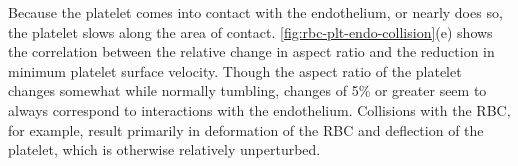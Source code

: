 Because the platelet comes into contact with the endothelium, or nearly does so, the platelet slows along the area
of contact. \cref{fig:rbc-plt-endo-collision}(e) shows the correlation between the relative change in aspect ratio
and the reduction in minimum platelet surface velocity. Though the aspect ratio of the platelet changes somewhat
while normally tumbling, changes of 5\% or greater seem to always correspond to interactions with the endothelium.
Collisions with the RBC, for example, result primarily in deformation of the RBC and deflection of the platelet,
which is otherwise relatively unperturbed.
